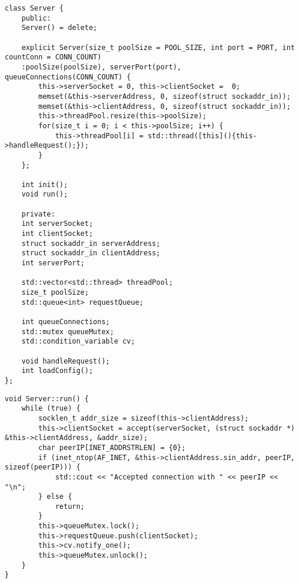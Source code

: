 \begin{center}
    \captionsetup{justification=raggedright,singlelinecheck=off}
    \begin{lstlisting}[label=lst:server_header,caption=Заголовочный файл реализации сервера, включающий в себя создание пула потоков]
class Server {
	public:
	Server() = delete;

	explicit Server(size_t poolSize = POOL_SIZE, int port = PORT, int countConn = CONN_COUNT)
	:poolSize(poolSize), serverPort(port), queueConnections(CONN_COUNT) {
		this->serverSocket = 0, this->clientSocket =  0;
		memset(&this->serverAddress, 0, sizeof(struct sockaddr_in));
		memset(&this->clientAddress, 0, sizeof(struct sockaddr_in));
		this->threadPool.resize(this->poolSize);
		for(size_t i = 0; i < this->poolSize; i++) {
			this->threadPool[i] = std::thread([this](){this->handleRequest();});
		}
	};

	int init();
	void run();

	private:
	int serverSocket;
	int clientSocket;
	struct sockaddr_in serverAddress;
	struct sockaddr_in clientAddress;
	int serverPort;

	std::vector<std::thread> threadPool;
	size_t poolSize;
	std::queue<int> requestQueue;

	int queueConnections;
	std::mutex queueMutex;
	std::condition_variable cv;

	void handleRequest();
	int loadConfig();
};
	\end{lstlisting}
\end{center}

\begin{center}
\captionsetup{justification=raggedright,singlelinecheck=off}
\begin{lstlisting}[label=lst:server_run,caption=Запуск сервера и алгоритм помещения запросов в очередь]
void Server::run() {
	while (true) {
		socklen_t addr_size = sizeof(this->clientAddress);
		this->clientSocket = accept(serverSocket, (struct sockaddr *) &this->clientAddress, &addr_size);
		char peerIP[INET_ADDRSTRLEN] = {0};
		if (inet_ntop(AF_INET, &this->clientAddress.sin_addr, peerIP, sizeof(peerIP))) {
			std::cout << "Accepted connection with " << peerIP << "\n";
		} else {
			return;
		}
		this->queueMutex.lock();
		this->requestQueue.push(clientSocket);
		this->cv.notify_one();
		this->queueMutex.unlock();
	}
}
\end{lstlisting}
\end{center}


